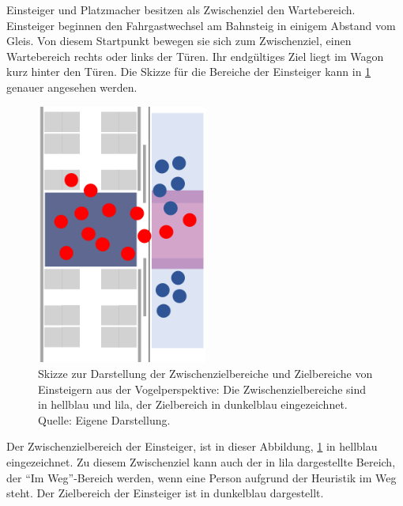 Einsteiger und Platzmacher besitzen als Zwischenziel den Wartebereich. Einsteiger beginnen den Fahrgastwechsel am Bahnsteig in einigem Abstand vom Gleis. Von diesem Startpunkt bewegen sie sich zum Zwischenziel, einen Wartebereich rechts oder links der Türen. Ihr endgültiges Ziel liegt im Wagon kurz hinter den Türen.
Die Skizze für die Bereiche der Einsteiger kann in \figurename \ref{fig:SkizzeEinsteiger} genauer angesehen werden.
\begin{figure}[H]
	\centering
		\includegraphics[angle=270, width=0.5\textwidth]{pictures/model/kognitive_heuristic_model/boarding_sketch.png}
	\caption{Skizze zur Darstellung der Zwischenzielbereiche und Zielbereiche von Einsteigern aus der Vogelperspektive: Die Zwischenzielbereiche sind in hellblau und lila, der Zielbereich in dunkelblau eingezeichnet. Quelle: Eigene Darstellung.}
	\label{fig:SkizzeEinsteiger}
\end{figure} 
Der Zwischenzielbereich der Einsteiger, ist in dieser Abbildung, \figurename \ref{fig:SkizzeEinsteiger} in hellblau eingezeichnet. Zu diesem Zwischenziel kann auch der in lila dargestellte Bereich, der "`Im Weg"'-Bereich werden, wenn eine Person aufgrund der Heuristik im Weg steht. Der Zielbereich der Einsteiger ist in dunkelblau dargestellt.

